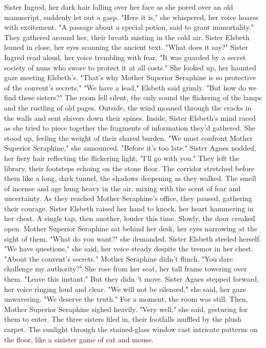 \documentclass[11pt]{article}
\begin{document}
Sister Ingred, her dark hair falling over her face as she pored over an old manuscript, suddenly let out a gasp. "Here it is," she whispered, her voice hoarse with excitement. "A passage about a special potion, said to grant immortality."
They gathered around her, their breath misting in the cold air. Sister Elsbeth leaned in close, her eyes scanning the ancient text. "What does it say?"
Sister Ingred read aloud, her voice trembling with fear. "It was guarded by a secret society of nuns who swore to protect it at all costs." She looked up, her haunted gaze meeting Elsbeth's. "That's why Mother Superior Seraphine is so protective of the convent's secrets."
"We have a lead," Elsbeth said grimly. "But how do we find these sisters?"
The room fell silent, the only sound the flickering of the lamps and the rustling of old pages.
Outside, the wind moaned through the cracks in the walls and sent shivers down their spines. Inside, Sister Elsbeth's mind raced as she tried to piece together the fragments of information they'd gathered. She stood up, feeling the weight of their shared burden. "We must confront Mother Superior Seraphine," she announced. "Before it's too late."
Sister Agnes nodded, her fiery hair reflecting the flickering light, "I'll go with you."
They left the library, their footsteps echoing on the stone floor. The corridor stretched before them like a long, dark tunnel, the shadows deepening as they walked. The smell of incense and age hung heavy in the air, mixing with the scent of fear and uncertainty. As they reached Mother Seraphine's office, they paused, gathering their courage. Sister Elsbeth raised her hand to knock, her heart hammering in her chest. A single tap, then another, louder this time.
Slowly, the door creaked open. Mother Superior Seraphine sat behind her desk, her eyes narrowing at the sight of them. "What do you want?" she demanded.
Sister Elsbeth steeled herself. "We have questions," she said, her voice steady despite the tremor in her chest. "About the convent's secrets."
Mother Seraphine didn't flinch. "You dare challenge my authority?" She rose from her seat, her tall frame towering over them. "Leave this instant."
But they didn 't move. Sister Agnes stepped forward, her voice ringing loud and clear. "We will not be silenced," she said, her gaze unwavering. "We deserve the truth."
For a moment, the room was still. Then, Mother Superior Seraphine sighed heavily. "Very well," she said, gesturing for them to enter. The three sisters filed in, their footfalls muffled by the plush carpet. The sunlight through the stained-glass window cast intricate patterns on the floor, like a sinister game of cat and mouse.
\end{document}
